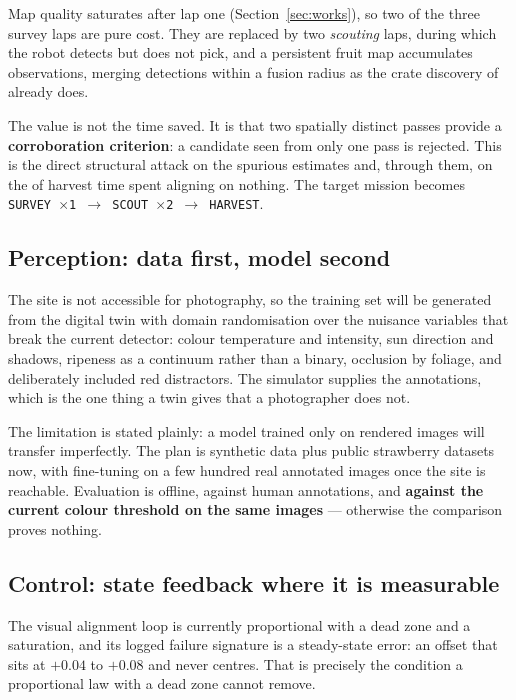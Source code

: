 \documentclass[conference]{IEEEtran}
\begin{document}
Map quality saturates after lap one (Section~\ref{sec:works}), so two of the
three survey laps are pure cost. They are replaced by two \emph{scouting}
laps, during which the robot detects but does not pick, and a persistent fruit
map accumulates observations, merging detections within a fusion radius as the
crate discovery of \phaseA{} already does.

The value is not the time saved. It is that two spatially distinct passes
provide a \textbf{corroboration criterion}: a candidate seen from only one
pass is rejected. This is the direct structural attack on the
 spurious estimates and, through them, on the
 of harvest time spent aligning on nothing. The target mission
becomes \texttt{SURVEY $\times$1 $\rightarrow$ SCOUT $\times$2 $\rightarrow$
HARVEST}.

\subsection{Perception: data first, model second}

The site is not accessible for photography, so the training set will be
generated from the digital twin with domain randomisation over the nuisance
variables that break the current detector: colour temperature and intensity,
sun direction and shadows, ripeness as a continuum rather than a binary,
occlusion by foliage, and deliberately included red distractors. The simulator
supplies the annotations, which is the one thing a twin gives that a
photographer does not.

The limitation is stated plainly: a model trained only on rendered images will
transfer imperfectly. The plan is synthetic data plus public strawberry
datasets \cite{sa2016deepfruits} now, with fine-tuning on a few hundred real
annotated images once the site is reachable. Evaluation is offline, against
human annotations, and \textbf{against the current colour threshold on the
same images} --- otherwise the comparison proves nothing.

\subsection{Control: state feedback where it is measurable}

The visual alignment loop is currently proportional with a dead zone and a
saturation, and its logged failure signature is a steady-state error: an offset
that sits at $+0.04$ to $+0.08$ and never centres. That is precisely the
condition a proportional law with a dead zone cannot remove.
\end{document}
